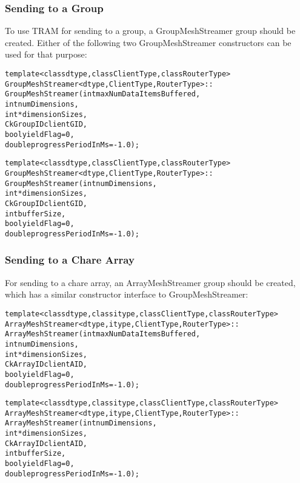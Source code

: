 \subsubsection{Sending to a Group}
To use TRAM for sending to a group, a GroupMeshStreamer group
should be created. Either of the following two GroupMeshStreamer
constructors can be used for that purpose:

\begin{alltt}
template<class dtype, class ClientType, class RouterType>
GroupMeshStreamer<dtype, ClientType, RouterType>::
GroupMeshStreamer(int maxNumDataItemsBuffered,
                  int numDimensions,
                  int *dimensionSizes,
                  CkGroupID clientGID,
                  bool yieldFlag = 0,
                  double progressPeriodInMs = -1.0);

template<class dtype, class ClientType, class RouterType>
GroupMeshStreamer<dtype, ClientType, RouterType>::
GroupMeshStreamer(int numDimensions,
                  int *dimensionSizes,
                  CkGroupID clientGID,
                  int bufferSize,
                  bool yieldFlag = 0,
                  double progressPeriodInMs = -1.0);

\end{alltt}

\subsubsection{Sending to a Chare Array}
For sending to a chare array, an ArrayMeshStreamer group should be
created, which has a similar constructor interface to GroupMeshStreamer:

\begin{alltt}
template <class dtype, class itype, class ClientType, class RouterType>
ArrayMeshStreamer<dtype, itype, ClientType, RouterType>::
ArrayMeshStreamer(int maxNumDataItemsBuffered,
                  int numDimensions,
                  int *dimensionSizes,
                  CkArrayID clientAID,
                  bool yieldFlag = 0,
                  double progressPeriodInMs = -1.0);

template <class dtype, class itype, class ClientType, class RouterType>
ArrayMeshStreamer<dtype, itype, ClientType, RouterType>::
ArrayMeshStreamer(int numDimensions,
                  int *dimensionSizes,
                  CkArrayID clientAID,
                  int bufferSize,
                  bool yieldFlag = 0,
                  double progressPeriodInMs = -1.0);

\end{alltt}

